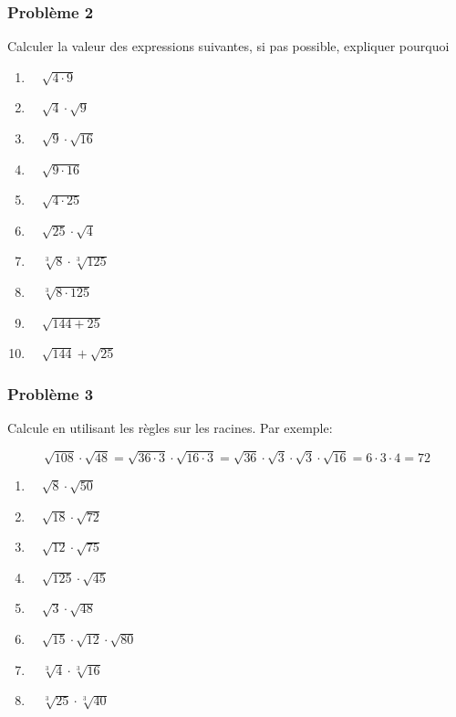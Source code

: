 \documentclass[
  12pt,
]{book}
\providecommand{\tightlist}{%
  \setlength{\itemsep}{0pt}\setlength{\parskip}{0pt}}
\begin{document}
\hypertarget{probluxe8me-2}{%
\subsubsection*{Problème 2}\label{probluxe8me-2}}

Calculer la valeur des expressions suivantes, si pas possible, expliquer pourquoi

\begin{enumerate}
\def\labelenumi{\arabic{enumi}.}
\tightlist
\item
  \(\quad \sqrt{4\cdot 9}\)
\item
  \(\quad \sqrt{4}\cdot\sqrt{9}\)
\item
  \(\quad \sqrt{9}\cdot\sqrt{16}\)
\item
  \(\quad \sqrt{9\cdot 16}\)
\item
  \(\quad \sqrt{4\cdot 25}\)
\item
  \(\quad \sqrt{25}\cdot\sqrt{4}\)
\item
  \(\quad \sqrt[3]{8}\cdot\sqrt[3]{125}\)
\item
  \(\quad \sqrt[3]{8\cdot 125}\)
\item
  \(\quad \sqrt{144+25}\)
\item
  \(\quad \sqrt{144}+\sqrt{25}\)
\end{enumerate}

\hypertarget{probluxe8me-3}{%
\subsubsection*{Problème 3}\label{probluxe8me-3}}

Calcule en utilisant les règles sur les racines. Par exemple:

\[\sqrt{108}\cdot\sqrt{48}=\sqrt{36\cdot 3}\cdot\sqrt{16\cdot 3}=\sqrt{36}\cdot\sqrt{3}\cdot\sqrt{3}\cdot\sqrt{16}=6\cdot 3\cdot 4=72\]

\begin{enumerate}
\def\labelenumi{\arabic{enumi}.}
\tightlist
\item
  \(\quad \sqrt{8}\cdot\sqrt{50}\)
\item
  \(\quad \sqrt{18}\cdot\sqrt{72}\)
\item
  \(\quad \sqrt{12}\cdot\sqrt{75}\)
\item
  \(\quad \sqrt{125}\cdot\sqrt{45}\)
\item
  \(\quad \sqrt{3}\cdot\sqrt{48}\)
\item
  \(\quad \sqrt{15}\cdot\sqrt{12}\cdot\sqrt{80}\)
\item
  \(\quad \sqrt[3]{4}\cdot\sqrt[3]{16}\)
\item
  \(\quad \sqrt[3]{25}\cdot\sqrt[3]{40}\)
\end{enumerate}
\end{document}
